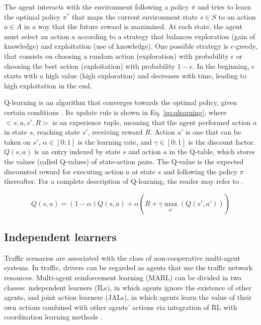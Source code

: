 \documentclass{RITA}
\begin{document}
The agent interacts with the environment following a policy $\pi$ and tries to learn the optimal policy $\pi^*$ that maps the current environment state $s \in S$ to an action $a \in A$ in a way that the future reward is maximized. At each state, the agent must select an action $a$ according to a strategy that balances exploration (gain of knowledge) and exploitation (use of knowledge). One possible strategy is $\epsilon$-greedy, that consists on choosing a random action (exploration) with probability $\epsilon$ or choosing the best action (exploitation) with probability $1 - \epsilon$. In the beginning, $\epsilon$ starts with a high value (high exploration) and decreases with time, leading to high exploitation in the end.

Q-learning is an algorithm that converges towards the optimal policy, given certain conditions \cite{Watkins&Dayan1992}. Its update rule is shown in Eq. \eqref{eq:qlearning}, where $<s,a,s',R>$ is an experience tuple, meaning that the agent performed action $a$ in state $s$, reaching state $s'$, receiving reward $R$. Action $a'$ is one that can be taken on $s'$, $\alpha \in [0:1]$ is the learning rate, and $\gamma \in [0:1]$ is the discount factor. $Q(s,a)$ is an entry indexed by state $s$ and action $a$ in the Q-table, which stores the values (called Q-values) of state-action pairs. The Q-value is the expected discounted reward for executing action $a$ at state $s$ and following the policy $\pi$ thereafter. For a complete description of Q-learning, the reader may refer to \cite{Watkins&Dayan1992}.

\begin{equation}
\label{eq:qlearning}
Q(s,a) = (1 - \alpha) Q(s,a) + \alpha (R + \gamma \max_{\substack{a'}}(Q(s',a')))
\end{equation}


\subsection{Independent learners} 
Traffic scenarios are associated with the class of non-cooperative multi-agent systems. In traffic, drivers can be regarded as agents that use the traffic network resources. Multi-agent reinforcement learning (MARL) can be divided in two classes: independent learners (ILs), in which agents ignore the existence of other agents, and joint action learners (JALs), in which agents learn the value of their own actions combined with other agents' actions via integration of RL with coordination learning methods \cite{Claus&Boutilier1998}. 
\end{document}

